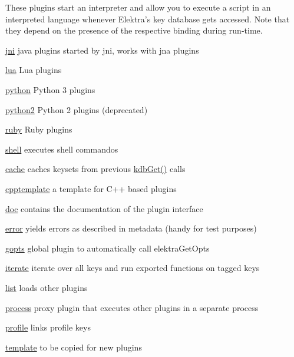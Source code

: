These plugins start an interpreter and allow you to execute a script in an interpreted language whenever Elektra’s key database gets accessed. Note that they depend on the presence of the respective binding during run-\/time.


\begin{DoxyItemize}
\item \mbox{\hyperlink{autotoc_md341_src_plugins_jni_README_md}{jni}} java plugins started by jni, works with jna plugins
\item \mbox{\hyperlink{autotoc_md390_src_plugins_lua_README_md}{lua}} Lua plugins
\item \mbox{\hyperlink{autotoc_md538_src_plugins_python_README_md}{python}} Python 3 plugins
\item \mbox{\hyperlink{autotoc_md544_src_plugins_python2_README_md}{python2}} Python 2 plugins (deprecated)
\item \mbox{\hyperlink{autotoc_md631_src_plugins_ruby_README_md}{ruby}} Ruby plugins
\item \mbox{\hyperlink{autotoc_md636_src_plugins_shell_README_md}{shell}} executes shell commandos
\end{DoxyItemize}


\begin{DoxyItemize}
\item \mbox{\hyperlink{autotoc_md71_src_plugins_cache_README_md}{cache}} caches keysets from previous {\ttfamily \mbox{\hyperlink{group__kdb_ga28e385fd9cb7ccfe0b2f1ed2f62453a1}{kdb\+Get()}}} calls
\item \mbox{\hyperlink{autotoc_md110_src_plugins_cpptemplate_README_md}{cpptemplate}} a template for C++ based plugins
\item \mbox{\hyperlink{autotoc_md196_src_plugins_doc_README_md}{doc}} contains the documentation of the plugin interface
\item \mbox{\hyperlink{autotoc_md203_src_plugins_error_README_md}{error}} yields errors as described in metadata (handy for test purposes)
\item \mbox{\hyperlink{autotoc_md248_src_plugins_gopts_README_md}{gopts}} global plugin to automatically call {\ttfamily elektra\+Get\+Opts}
\item \mbox{\hyperlink{autotoc_md340_src_plugins_iterate_README_md}{iterate}} iterate over all keys and run exported functions on tagged keys
\item \mbox{\hyperlink{autotoc_md384_src_plugins_list_README_md}{list}} loads other plugins
\item \mbox{\hyperlink{autotoc_md529_src_plugins_process_README_md}{process}} proxy plugin that executes other plugins in a separate process
\item \mbox{\hyperlink{autotoc_md536_src_plugins_profile_README_md}{profile}} links profile keys
\item \mbox{\hyperlink{autotoc_md684_src_plugins_template_README_md}{template}} to be copied for new plugins 
\end{DoxyItemize}